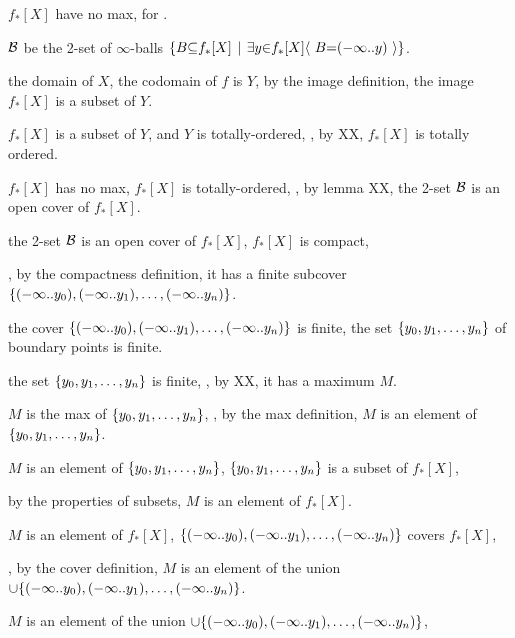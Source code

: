 \vs
{} $f_*[X]$ have no max, for . \par
{} ${\cal B}$ be the 2-set of $\infty$-balls $\a\{B \p\subseteq f_*[X] \pipe \a\exists y \p\in f_*[X] \a\langle~ B \p= \a(\p-\infty \a{..} y\a) ~\a\rangle \a\}$. \par
{} the domain of $X$,  the codomain of $f$ is $Y$,  by the image definition, the image $f_*[X]$ is a subset of $Y$. \par
{} $f_*[X]$ is a subset of $Y$, and $Y$ is totally-ordered, , by XX, $f_*[X]$ is totally ordered. \par
{} $f_*[X]$ has no max,  $f_*[X]$ is totally-ordered,
, by lemma XX, the 2-set ${\cal B}$ is an open cover of $f_*[X]$. \par
{} the 2-set ${\cal B}$ is an open cover of $f_*[X]$,  $f_*[X]$ is compact, \par
{}, by the compactness definition, it has a finite subcover $\a\{\a(\p-\infty\a{..}y_0\a), \a(\p-\infty\a{..}y_1\a), \ldots, \a(\p-\infty\a{..}y_n\a)\a\}$. \par
{} the cover $\a\{\a(\p-\infty\a{..}y_0\a), \a(\p-\infty\a{..}y_1\a), \ldots, \a(\p-\infty\a{..}y_n\a)\a\}$ is finite,  the set $\a\{y_0, y_1, \ldots, y_n\a\}$ of boundary points is finite. \par
{} the set $\a\{y_0, y_1, \ldots, y_n\a\}$ is finite, , by XX, it has a maximum $M$. \par
{} $M$ is the max of $\a\{y_0, y_1, \ldots, y_n\a\}$, , by the max definition, $M$ is an element of $\a\{y_0, y_1, \ldots, y_n\a\}$. \par
{} $M$ is an element of $\a\{y_0, y_1, \ldots, y_n\a\}$,  $\a\{y_0, y_1, \ldots, y_n\a\}$ is a subset of $f_*[X]$, \par
{} by the properties of subsets, $M$ is an element of $f_*[X]$. \par
{} $M$ is an element of $f_*[X]$,  $\a\{\a(\p-\infty\a{..}y_0\a), \a(\p-\infty\a{..}y_1\a), \ldots, \a(\p-\infty\a{..}y_n\a)\a\}$ covers $f_*[X]$, \par
{}, by the cover definition, $M$ is an element of the union $\p\cup \a\{\a(\p-\infty\a{..}y_0\a), \a(\p-\infty\a{..}y_1\a), \ldots, \a(\p-\infty\a{..}y_n\a)\a\}$. \par
{} $M$ is an element of the union $\p\cup \a\{\a(\p-\infty\a{..}y_0\a), \a(\p-\infty\a{..}y_1\a), \ldots, \a(\p-\infty\a{..}y_n\a)\a\}$, \par
